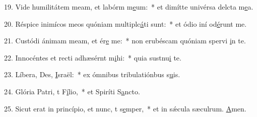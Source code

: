 19. Vide humilitátem meam, et labórm m\uline{e}um:~* et dimítte univérsa delcta m\uline{e}a.\par 
20. Réspice inimícos meos quóniam multiplc\uline{á}ti sunt:~* et ódio iní od\uline{é}runt me.\par 
21. Custódi ánimam meam, et ér\uline{e} me:~* non erubéscam quóniam spervi \uline{i}n te.\par 
22. Innocéntes et recti adhæsérnt m\uline{i}hi:~* quia sustnu\uline{i} te.\par 
23. Líbera, Des, \uline{I}sraël:~* ex ómnibus tribulatiónbus s\uline{u}is.\par 
24. Glória Patri, t F\uline{í}lio,~* et Spiríti S\uline{a}ncto.\par 
25. Sicut erat in princípio, et nunc, t s\uline{e}mper,~* et in sǽcula sæculrum. \uline{A}men.\par 
